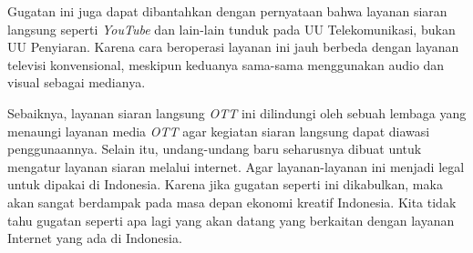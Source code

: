 \documentclass[12pt]{article}
\begin{document}
    Gugatan ini juga dapat dibantahkan dengan pernyataan bahwa layanan
    siaran langsung seperti \emph{YouTube} dan lain-lain tunduk pada UU
    Telekomunikasi, bukan UU Penyiaran. Karena cara beroperasi layanan ini
    jauh berbeda dengan layanan televisi konvensional, meskipun keduanya
    sama-sama menggunakan audio dan visual sebagai medianya.

    Sebaiknya, layanan siaran langsung \emph{OTT} ini dilindungi oleh sebuah
    lembaga yang menaungi layanan media \emph{OTT} agar kegiatan siaran
    langsung dapat diawasi penggunaannya. Selain itu, undang-undang baru
    seharusnya dibuat untuk mengatur layanan siaran melalui internet. Agar
    layanan-layanan ini menjadi legal untuk dipakai di Indonesia. Karena
    jika gugatan seperti ini dikabulkan, maka akan sangat berdampak pada
    masa depan ekonomi kreatif Indonesia. Kita tidak tahu gugatan seperti
    apa lagi yang akan datang yang berkaitan dengan layanan Internet yang
    ada di Indonesia.
\end{document}

